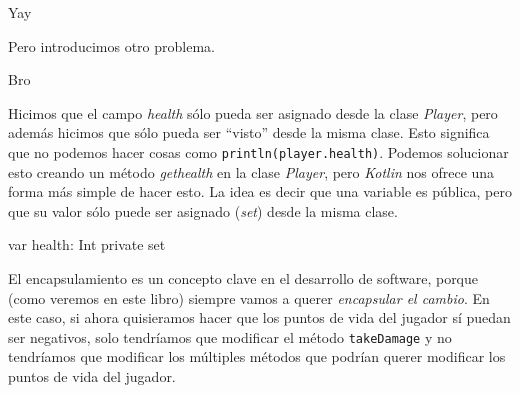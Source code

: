   \begin{center}
    Yay
  \end{center}

  Pero introducimos otro problema.

  \begin{center}
    Bro
  \end{center}

  Hicimos que el campo \textit{health} sólo pueda ser asignado desde la clase 
  \textit{Player}, pero además hicimos que sólo pueda ser \enquote{visto} desde la misma clase.
  Esto significa que no podemos hacer cosas como \texttt{println(player.health)}.
  Podemos solucionar esto creando un método \textit{gethealth} en la clase \textit{Player},
  pero \textit{Kotlin} nos ofrece una forma más simple de hacer esto.
  La idea es decir que una variable es pública, pero que su valor sólo puede ser asignado 
  (\textit{set}) desde la misma clase.

  \begin{kotlin}
    var health: Int private set
  \end{kotlin}

  El encapsulamiento es un concepto clave en el desarrollo de software, porque (como veremos en este 
  libro) siempre vamos a querer \textit{encapsular el cambio}.
  En este caso, si ahora quisieramos hacer que los puntos de vida del jugador sí puedan ser 
  negativos, solo tendríamos que modificar el método \texttt{takeDamage} y no tendríamos que
  modificar los múltiples métodos que podrían querer modificar los puntos de vida del jugador.
  